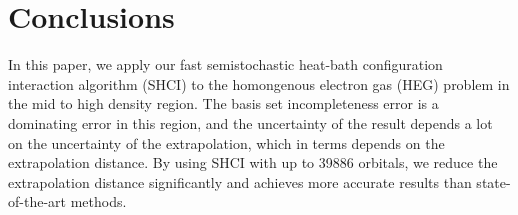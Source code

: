 \section{Conclusions}
In this paper, we apply our fast semistochastic heat-bath configuration interaction algorithm (SHCI) to the homongenous electron gas (HEG) problem in the mid to high density region.
The basis set incompleteness error is a dominating error in this region, and the uncertainty of the result depends a lot on the uncertainty of the extrapolation, which in terms depends on the extrapolation distance.
By using SHCI with up to 39886 orbitals, we reduce the extrapolation distance significantly and achieves more accurate results than state-of-the-art methods.

\label{conclusions}

